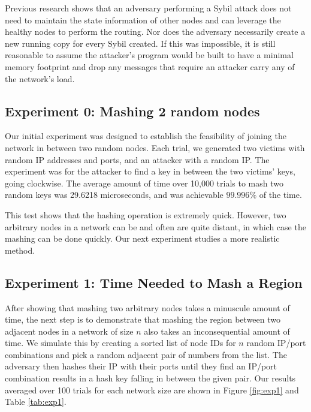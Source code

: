 \documentclass[11pt,conference]{IEEEtran}
\begin{document}
Previous research \cite{sybilbit} shows that an adversary performing a Sybil attack does not need to maintain the state information of other nodes and can leverage the healthy nodes to perform the routing.
Nor does the adversary necessarily create a new running copy for every Sybil created. 
If this was impossible, it is still reasonable to assume the attacker's program would be built to have a minimal memory footprint and drop any messages that require an attacker carry any of the network's load.






\subsection{Experiment 0: Mashing 2 random nodes}
Our initial experiment was designed to establish the feasibility of joining the network in between two random nodes.
Each trial, we generated two victims with random IP addresses and ports, and an attacker with a random IP.
The experiment was for the attacker to find a key in between the two victims' keys, going clockwise.
The average amount of time over 10,000 trials to mash two random keys was 29.6218 microseconds, and was achievable $ 99.996\%$ of the time.

This test shows that the hashing operation is extremely quick.
However, two arbitrary nodes in a network can be and often are quite distant, in which case the mashing can be done quickly.
Our next experiment studies a more realistic method.


\subsection{Experiment 1:  Time Needed to Mash a Region}
\label{sec:exp1}
After showing that mashing two arbitrary nodes takes a minuscule amount of time, the next step is to demonstrate that mashing the region between two adjacent nodes in a network of size $n$ also takes an inconsequential amount of time.
We simulate this by creating a sorted list of node IDs for $n$ random IP/port combinations and pick a random adjacent pair of numbers from the list.
The adversary then hashes their IP with their ports until they find an IP/port combination results in a hash key falling in between the given pair.
Our results averaged over 100 trials for each network size are shown in Figure \ref{fig:exp1} and Table \ref{tab:exp1}.
\end{document}
